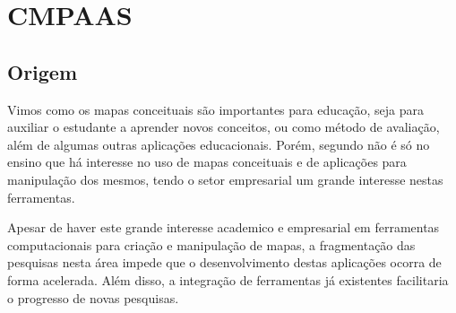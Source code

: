 \chapter{CMPAAS}
\section{Origem}

Vimos como os mapas conceituais são importantes para educação, seja para auxiliar o estudante a aprender novos conceitos, ou como método de avaliação, além de algumas outras aplicações educacionais. Porém, segundo \cite{Perin2014} não é só no ensino que há interesse no uso de mapas conceituais e de aplicações para manipulação dos mesmos, tendo o setor empresarial um grande interesse nestas ferramentas. 

Apesar de haver este grande interesse academico e empresarial em ferramentas computacionais para criação e manipulação de mapas, a fragmentação das pesquisas nesta área impede que o desenvolvimento destas aplicações ocorra de forma acelerada. Além disso, a integração de ferramentas já existentes facilitaria o progresso de novas pesquisas.

